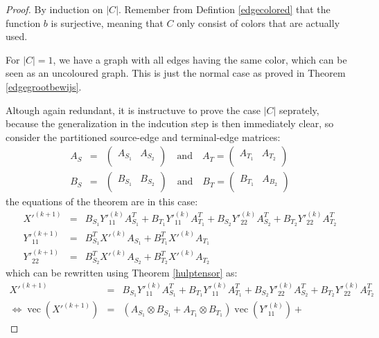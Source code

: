 \documentclass[a4paper,11pt]{report}
\newcommand{\vect}{\operatorname{vec}}
\begin{document}
\begin{proof}
  By induction on $|C|$. Remember from Defintion \ref{edgecolored} that the 
  function $b$ is surjective, meaning that $C$ only consist of colors that are 
  actually used.
  
  For $|C| = 1$, we have a graph with all edges having the same color, which can 
  be seen as an uncoloured graph. This is just the normal case as proved in 
  Theorem \ref{edgegrootbewijs}.
  
  Altough again redundant, it is instructuve to prove the case $|C|$ seprately, 
  because the generalization in the indcution step is then immediately clear, so 
  consider the partitioned source-edge and terminal-edge matrices:
  \begin{eqnarray*}
    A_S &=& \begin{pmatrix}
A_{S_1} & A_{S_2}\\
\end{pmatrix} \quad \text{and} \quad  A_T = \begin{pmatrix}
A_{T_1} & A_{T_2}\\
\end{pmatrix}\\
    B_S &=& \begin{pmatrix}
B_{S_1} & B_{S_2}\\
\end{pmatrix} \quad \text{and} \quad  B_T = \begin{pmatrix}
B_{T_1} & A_{B_2}\\
\end{pmatrix}
  \end{eqnarray*}
  the equations of the theorem are in this case:
   \begin{eqnarray*}
   X'^{(k+1)} &=& B_{S_1}Y'^{(k)}_{11} A^T_{S_1} +  B_{T_1}Y'^{(k)}_{11} 
   A^T_{T_1} +  B_{S_2}Y'^{(k)}_{22} A^T_{S_2} +  B_{T_2}Y'^{(k)}_{22} 
   A^T_{T_2}\\
   Y'^{(k+1)}_{11} &=& B^T_{S_1}X'^{(k)}A_{S_1} + B^T_{T_1}X'^{(k)}A_{T_1}\\
   Y'^{(k+1)}_{22} &=& B^T_{S_2}X'^{(k)}A_{S_2} + B^T_{T_2}X'^{(k)}A_{T_2}
    \end{eqnarray*}
which can be rewritten using Theorem \ref{hulptensor} as:
\begin{eqnarray*}
  X'^{(k+1)} &=& B_{S_1}Y'^{(k)}_{11} A^T_{S_1} +  B_{T_1}Y'^{(k)}_{11} 
   A^T_{T_1} +  B_{S_2}Y'^{(k)}_{22} A^T_{S_2} +  B_{T_2}Y'^{(k)}_{22} 
   A^T_{T_2} \\
  \Leftrightarrow\vect(X'^{(k+1)}) &=& (A_{S_1} \otimes  B_{S_1} + A_{T_1} \otimes B_{T_1})\vect(Y'^{(k)}_{11}) + 

\end{eqnarray*}
\end{proof}
\end{document}
